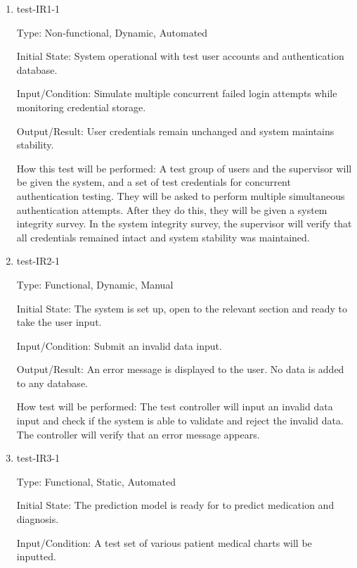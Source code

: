 \documentclass[12pt, titlepage]{article}
\begin{document}
\begin{enumerate}
    \item{test-IR1-1}  \label{test-IR1-1}
    
    Type: Non-functional, Dynamic, Automated
    
    Initial State: System operational with test user accounts and authentication database.
    
    Input/Condition: Simulate multiple concurrent failed login attempts while monitoring credential storage.
    
    Output/Result: User credentials remain unchanged and system maintains stability.
    
    How this test will be performed: A test group of users and the supervisor will be given the system, and a set of test credentials for concurrent authentication testing. They will be asked to perform multiple simultaneous authentication attempts. After they do this, they will be given a system integrity survey. In the system integrity survey, the supervisor will verify that all credentials remained intact and system stability was maintained.



    \item{test-IR2-1} \label{test-IR2-1} %
    
    Type: Functional, Dynamic, Manual
    
    Initial State: The system is set up, open to the relevant section and ready to take the user input.
    
    Input/Condition: Submit an invalid data input.
    
    Output/Result: An error message is displayed to the user. No data is added to any database. 
    
    How test will be performed: The test controller will input an invalid data input and check if the system is able to validate and reject the invalid data. The controller will verify that an error message appears.


    \item{test-IR3-1}  \label{test-IR3-1} %
    
    Type: Functional, Static, Automated
    
    Initial State: The prediction model is ready for to predict medication and diagnosis.
    
    Input/Condition: A test set of various patient medical charts will be inputted.
    

\end{enumerate}
\end{document}

